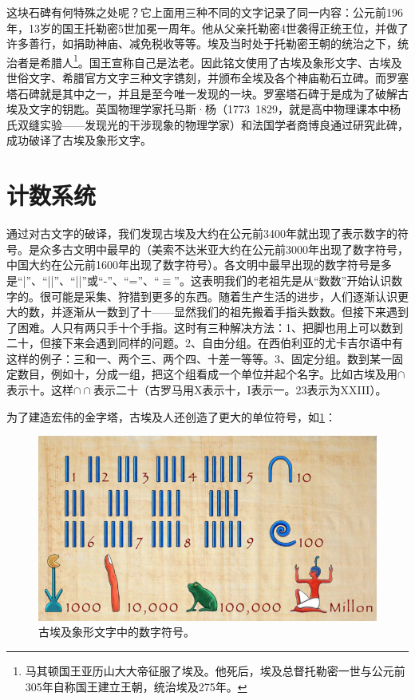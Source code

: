 \documentclass[b5paper]{ctexart}
\begin{document}
这块石碑有何特殊之处呢？它上面用三种不同的文字记录了同一内容：公元前196年，13岁的国王托勒密5世加冕一周年。他从父亲托勒密4世袭得正统王位，并做了许多善行，如捐助神庙、减免税收等等。埃及当时处于托勒密王朝的统治之下，统治者是希腊人\footnote{马其顿国王亚历山大大帝征服了埃及。他死后，埃及总督托勒密一世与公元前305年自称国王建立王朝，统治埃及275年。}。国王宣称自己是法老。因此铭文使用了古埃及象形文字、古埃及世俗文字、希腊官方文字三种文字镌刻，并颁布全埃及各个神庙勒石立碑。而罗塞塔石碑就是其中之一，并且是至今唯一发现的一块。罗塞塔石碑于是成为了破解古埃及文字的钥匙。英国物理学家托马斯·杨（1773~1829，就是高中物理课本中杨氏双缝实验——发现光的干涉现象的物理学家）和法国学者商博良通过研究此碑，成功破译了古埃及象形文字。

\section{计数系统}

通过对古文字的破译，我们发现古埃及大约在公元前3400年就出现了表示数字的符号。是众多古文明中最早的（美索不达米亚大约在公元前3000年出现了数字符号，中国大约在公元前1600年出现了数字符号）。各文明中最早出现的数字符号是多是“|”、“||”、“||”或“-”、“=”、“$\equiv$”。这表明我们的老祖先是从“数数”开始认识数字的。很可能是采集、狩猎到更多的东西。随着生产生活的进步，人们逐渐认识更大的数，并逐渐从一数到了十——显然我们的祖先搬着手指头数数。但接下来遇到了困难。人只有两只手十个手指。这时有三种解决方法：1、把脚也用上可以数到二十，但接下来会遇到同样的问题。2、自由分组。在西伯利亚的尤卡吉尔语中有这样的例子：三和一、两个三、两个四、十差一等等。3、固定分组。数到某一固定数目，例如十，分成一组，把这个组看成一个单位并起个名字。比如古埃及用$\cap$表示十。这样$\cap \cap$表示二十（古罗马用X表示十，I表示一。23表示为XXIII）。

为了建造宏伟的金字塔，古埃及人还创造了更大的单位符号，如\cref{fig:egypt-hieroglyphic-numerals}：

\begin{figure}[htbp]
 \centering
 \includegraphics[scale=0.8]{img/hieroglyphic-numbers}
 \caption{古埃及象形文字中的数字符号。}
 \label{fig:egypt-hieroglyphic-numerals}
\end{figure}
\end{document}
